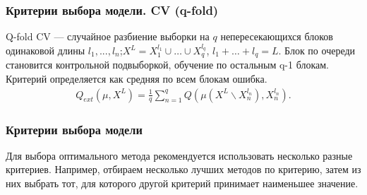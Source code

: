 \documentclass[11pt]{beamer}
\begin{document}
\begin{frame}
	\frametitle{Критерии выбора модели. CV (q-fold)}
	
		Q-fold CV --- случайное разбиение выборки на $q$ непересекающихся блоков одинаковой длины $l_1, ..., l_n$;$ X^L = X_{1}^{l_1} \cup \dots \cup  X_{q}^{l_q}$, $l_1 + \dots + l_q = L$. Блок по очереди становится контрольной подвыборкой, обучение по остальным q-1 блокам. Критерий определяется как средняя по всем блокам ошибка. 
	\begin{eqnarray}\label{Q-fold}  
		Q_{ext}(\mu, X^L) =\frac{1}{q} \sum_{n = 1}^{q} Q (\mu(X^L \backslash X_{n}^{l_n}), X_{n}^{l_n}). 
	\end{eqnarray}
	
\end{frame}

\begin{frame}
	\frametitle{Критерии выбора модели}
	Для выбора оптимального метода рекомендуется использовать несколько разные критериев. Например, отбираем  несколько лучших методов по критерию, затем из них выбрать тот, для которого другой критерий принимает наименьшее значение.
\end{frame}
\end{document}
